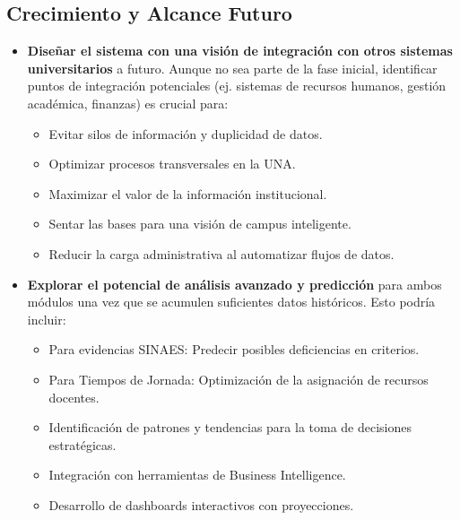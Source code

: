 \subsection{Crecimiento y Alcance Futuro}
\begin{itemize}
    \item \textbf{Diseñar el sistema con una visión de integración con otros sistemas
        universitarios} a futuro. Aunque no sea parte de la fase inicial, identificar
        puntos de integración potenciales (ej. sistemas de recursos humanos, gestión
        académica, finanzas) es crucial para:
        \begin{itemize}
            \item Evitar silos de información y duplicidad de datos.
            \item Optimizar procesos transversales en la UNA.
            \item Maximizar el valor de la información institucional.
            \item Sentar las bases para una visión de campus inteligente.
            \item Reducir la carga administrativa al automatizar flujos de datos.
        \end{itemize}

    \item \textbf{Explorar el potencial de análisis avanzado y predicción} para
        ambos módulos una vez que se acumulen suficientes datos históricos. Esto
        podría incluir:
        \begin{itemize}
            \item Para evidencias SINAES: Predecir posibles deficiencias en criterios.
            \item Para Tiempos de Jornada: Optimización de la asignación de recursos docentes.
            \item Identificación de patrones y tendencias para la toma de decisiones estratégicas.
            \item Integración con herramientas de Business Intelligence.
            \item Desarrollo de dashboards interactivos con proyecciones.
        \end{itemize}


\end{itemize}
